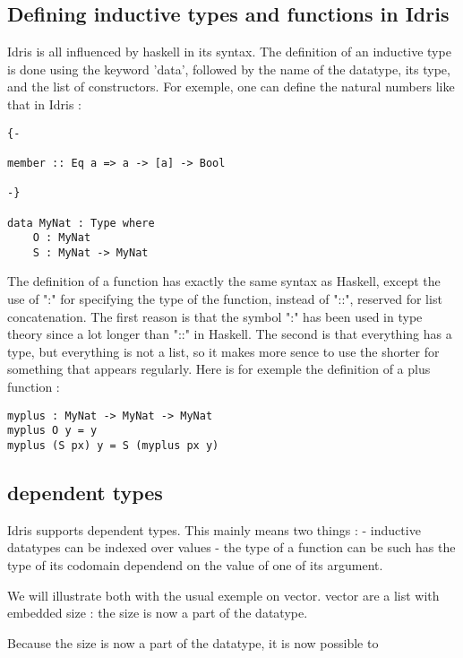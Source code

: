 \documentclass{sigplanconf}
\begin{document}
\subsection{Defining inductive types and functions in Idris}

Idris is all influenced by haskell in its syntax.
The definition of an inductive type is done using the keyword 'data', followed by the name of the datatype, its type, and the list of constructors.
For exemple, one can define the natural numbers like that in Idris :

\begin{lstlisting}[caption=inductive datatype, captionpos=b, label=lst1:haskell2]
{-

member :: Eq a => a -> [a] -> Bool

-} 

data MyNat : Type where
	O : MyNat
	S : MyNat -> MyNat
\end{lstlisting}

The definition of a function has exactly the same syntax as Haskell, except the use of ":" for specifying the type of the function, instead of "::", reserved for list concatenation. The first reason is that the symbol ":" has been used in type theory since a lot longer than "::" in Haskell. The second is that everything has a type, but everything is not a list, so it makes more sence to use the shorter for something that appears regularly.
Here is for exemple the definition of a plus function :

\begin{lstlisting}[caption=recursive function, captionpos=b, label=lst2:haskell2]
myplus : MyNat -> MyNat -> MyNat
myplus O y = y
myplus (S px) y = S (myplus px y) 
\end{lstlisting}

\subsection{dependent types}
Idris supports dependent types. This mainly means two things :
- inductive datatypes can be indexed over values
- the type of a function can be such has the type of its codomain dependend on the value of one of its argument.

We will illustrate both with the usual exemple on vector. vector are a list with embedded size : the size is now a part of the datatype.


Because the size is now a part of the datatype, it is now possible to 
\end{document}
